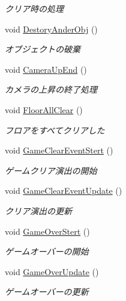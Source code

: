 \begin{DoxyCompactItemize}
\begin{DoxyCompactList}\small\item\em クリア時の処理 \end{DoxyCompactList}\item 
void \hyperlink{class_a_l_l_tower_aa97b8b7040c9e79196555bc67aaa49e4}{Destory\+Ander\+Obj} ()
\begin{DoxyCompactList}\small\item\em オブジェクトの破棄 \end{DoxyCompactList}\item 
void \hyperlink{class_a_l_l_tower_a26c3821f8496577c36b16c0176fd79b6}{Camera\+Up\+End} ()
\begin{DoxyCompactList}\small\item\em カメラの上昇の終了処理 \end{DoxyCompactList}\item 
void \hyperlink{class_a_l_l_tower_a84b1273de1512284c703066b41c9f290}{Floor\+All\+Clear} ()
\begin{DoxyCompactList}\small\item\em フロアをすべてクリアした \end{DoxyCompactList}\item 
void \hyperlink{class_a_l_l_tower_ac035c6f40e4fb3235fc8fe0821263c52}{Game\+Clear\+Event\+Stert} ()
\begin{DoxyCompactList}\small\item\em ゲームクリア演出の開始 \end{DoxyCompactList}\item 
void \hyperlink{class_a_l_l_tower_ab102e5acd30714b1b41ab0861ca1366e}{Game\+Clear\+Event\+Update} ()
\begin{DoxyCompactList}\small\item\em クリア演出の更新 \end{DoxyCompactList}\item 
void \hyperlink{class_a_l_l_tower_a283b74e62516175229f93d819bbffeea}{Game\+Over\+Stert} ()
\begin{DoxyCompactList}\small\item\em ゲームオーバーの開始 \end{DoxyCompactList}\item 
void \hyperlink{class_a_l_l_tower_af4e2bbc28056233f82dfb9ea4a7612bf}{Game\+Over\+Update} ()
\begin{DoxyCompactList}\small\item\em ゲームオーバーの更新 \end{DoxyCompactList}\item 

\end{DoxyCompactItemize}
